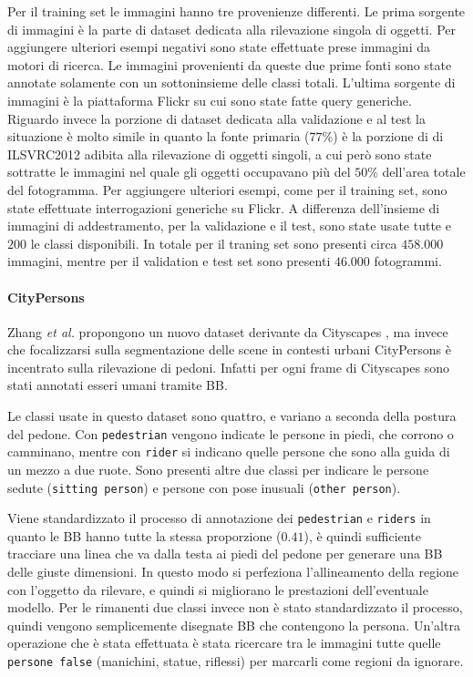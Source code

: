 Per il training set le immagini hanno tre provenienze differenti. Le prima sorgente di immagini è la parte di dataset dedicata alla rilevazione singola di oggetti. Per aggiungere ulteriori esempi negativi sono state effettuate prese immagini da motori di ricerca. Le immagini provenienti da queste due prime fonti sono state annotate solamente con un sottoninsieme delle classi totali. L'ultima sorgente di immagini è la piattaforma Flickr su cui sono state fatte query generiche. 
Riguardo invece la porzione di dataset dedicata alla validazione e al test la situazione è molto simile in quanto la fonte primaria ($77\%$) è la porzione di di \ac{ILSVRC}2012 adibita alla rilevazione di oggetti singoli, a cui però sono state sottratte le immagini nel quale gli oggetti occupavano più del $50\%$ dell'area totale del fotogramma. Per aggiungere ulteriori esempi, come per il training set, sono state effettuate interrogazioni generiche su Flickr. A differenza dell'insieme di immagini di addestramento, per la validazione e il test, sono state usate tutte e $200$ le classi disponibili. 
In totale per il traning set sono presenti circa $458.000$ immagini, mentre per il validation e test set sono presenti $46.000$ fotogrammi. 
\paragraph{CityPersons} Zhang \textit{et al. } \cite{zhang2017citypersons} propongono un nuovo dataset derivante da Cityscapes \cite{cordts2016cityscapes}, ma invece che focalizzarsi sulla segmentazione delle scene in contesti urbani CityPersons è incentrato sulla rilevazione di pedoni. Infatti per ogni frame di Cityscapes sono stati annotati esseri umani tramite \ac{BB}.

Le classi usate in questo dataset sono quattro, e variano a seconda della postura del pedone. Con \texttt{pedestrian} vengono indicate le persone in piedi, che corrono o camminano, mentre con \texttt{rider} si indicano quelle persone che sono alla guida di un mezzo a due ruote. Sono presenti altre due classi per indicare le persone sedute (\texttt{sitting person}) e persone con pose inusuali (\texttt{other person}).

Viene standardizzato il processo di annotazione dei \texttt{pedestrian} e \texttt{riders} in quanto le \ac{BB} hanno tutte la stessa proporzione ($0.41$), è quindi sufficiente tracciare una linea che va dalla testa ai piedi del pedone per generare una \ac{BB} delle giuste dimensioni. In questo modo si perfeziona l'allineamento della regione con l'oggetto da rilevare, e quindi si migliorano le prestazioni dell'eventuale modello. 
Per le rimanenti due classi invece non è stato standardizzato il processo, quindi vengono semplicemente disegnate \ac{BB} che contengono la persona. Un'altra operazione che è stata effettuata è stata ricercare tra le immagini tutte quelle \texttt{persone false} (manichini, statue, riflessi) per marcarli come regioni da ignorare. 

